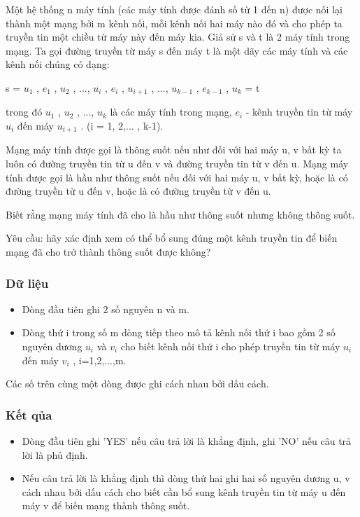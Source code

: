 



   Một hệ thống n máy tính (các máy tính được đánh số từ 1 đến n) được nối lại thành một mạng bởi m kênh nối, mỗi kênh nối hai máy nào đó và cho phép ta truyền tin một chiều từ máy này đến máy kia. Giả sử s và t là 2 máy tính trong mạng. Ta gọi đường truyền từ máy s đến máy t là một dãy các máy tính và các kênh nối chúng có dạng:  

   s = $u_{1}$   , $e_{1}$   , $u_{2}$   , ..., $u_{i}$   , $e_{i}$   , $u_{i+1}$   , ..., $u_{k-1}$   , $e_{k-1}$   , $u_{k}$   = t  

   trong đó $u_{1}$   , $u_{2}$   , ..., $u_{k}$   là các máy tính trong mạng, $e_{i}$   - kênh truyền tin từ máy $u_{i}$   đến máy $u_{i+1}$   . (i = 1, 2,... , k-1).  

   Mạng máy tính được gọi là thông suốt nếu như đối với hai máy u, v bất kỳ ta luôn có đường truyền tin từ u đến v và đường truyền tin từ v đến u. Mạng máy tính được gọi là hầu như thông suốt nếu đối với hai máy u, v bất kỳ, hoặc là có đường truyền từ u đến v, hoặc là có đường truyền từ v đến u.  

   Biết rằng mạng máy tính đã cho là hầu như thông suốt nhưng không thông suốt.  

   Yêu cầu: hãy xác định xem có thể bổ sung đúng một kênh truyền tin để biến mạng đã cho trở thành thông suốt được không?  

\subsubsection{   Dữ liệu  }
\begin{itemize}
	\item     Dòng đầu tiên ghi 2 số nguyên n và m.   
	\item     Dòng thứ i trong số m dòng tiếp theo mô tả kênh nối thứ i bao gồm 2 số nguyên dương $u_{i}$    và $v_{i}$    cho biết kênh nối thứ i cho phép truyền tin từ máy $u_{i}$    đến máy $v_{i}$    , i=1,2,...,m.   
\end{itemize}

   Các số trên cùng một dòng được ghi cách nhau bởi dấu cách.  

\subsubsection{   Kết qủa  }
\begin{itemize}
	\item     Dòng đầu tiên ghi 'YES' nếu câu trả lời là khẳng định, ghi 'NO' nếu câu trả lời là phủ định.   
	\item     Nếu câu trả lời là khẳng định thì dòng thứ hai ghi hai số nguyên dương u, v cách nhau bởi dấu cách cho biết cần bổ sung kênh truyền tin từ máy u đến máy v để biến mạng thành thông suốt.   
\end{itemize}

